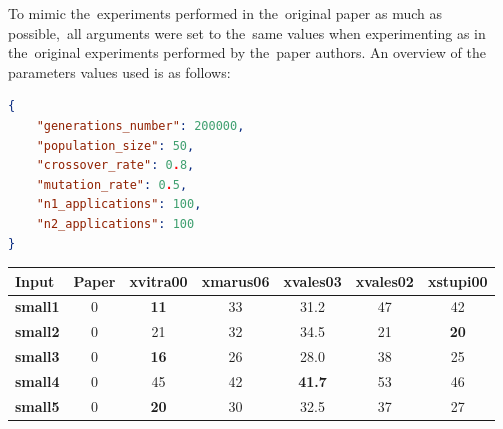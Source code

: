To mimic the~experiments performed in the~original paper as much as possible,~all arguments were set to the~same values when experimenting as in the~original experiments performed by the~paper authors.
An overview of the parameters values used is as follows:
\begin{lstlisting}[language=json,firstnumber=1]
{
    "generations_number": 200000,
    "population_size": 50,
    "crossover_rate": 0.8,
    "mutation_rate": 0.5,
    "n1_applications": 100,
    "n2_applications": 100
}
\end{lstlisting}

\begin{table}[ht!]
\begin{center}
\begin{tabular}{|l|c|c|c|c|c|c|}
\hline
\textbf{Input}   & \multicolumn{1}{l|}{\textbf{Paper}} & \multicolumn{1}{l|}{\textbf{xvitra00}} & \multicolumn{1}{l|}{\textbf{xmarus06}} & \multicolumn{1}{l|}{\textbf{xvales03}} & \multicolumn{1}{l|}{\textbf{xvales02}} & \multicolumn{1}{l|}{\textbf{xstupi00}} \\ \hline
\textbf{small1}  & 0                                   & \textbf{11}                            & 33                                     & 31.2                                   & 47                                     & 42                                     \\ \hline
\textbf{small2}  & 0                                   & 21                                     & 32                                     & 34.5                                   & 21                                     & \textbf{20}                            \\ \hline
\textbf{small3}  & 0                                   & \textbf{16}                            & 26                                     & 28.0                                   & 38                                     & 25                                     \\ \hline
\textbf{small4}  & 0                                   & 45                                     & 42                                     & \textbf{41.7}                          & 53                                     & 46                                     \\ \hline
\textbf{small5}  & 0                                   & \textbf{20}                            & 30                                     & 32.5                                   & 37                                     & 27                                     \\ \hline

\end{tabular}
\end{center}
\end{table}
